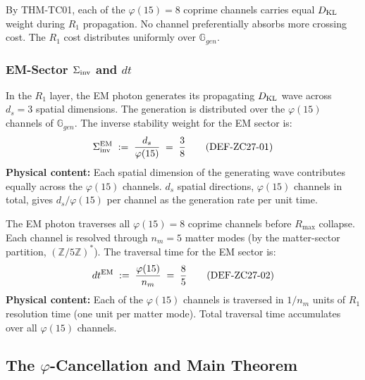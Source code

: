 \documentclass[12pt, a4paper]{article}
\begin{document}
\begin{keybox}[title={Uniformity of $R_1$ Channel Weight}]
By THM-TC01, each of the $\varphi(15) = 8$ coprime channels
carries equal $D_{\rm KL}$ weight during $R_1$ propagation.
No channel preferentially absorbs more crossing cost.
The $R_1$ cost distributes uniformly over $\mathbb{G}_{gen}$.
\end{keybox}

\subsubsection{EM-Sector $\Sigma_{\rm inv}$ and $dt$}

\begin{formalbox}[title={DEF-ZC27-01: $\Sigma_{\rm inv}^{\rm EM}$
  --- Spatial Generation Rate}]
In the $R_1$ layer, the EM photon generates its propagating
$D_{\rm KL}$ wave across $d_s = 3$ spatial dimensions.
The generation is distributed over the $\varphi(15)$ channels
of $\mathbb{G}_{gen}$. The inverse stability weight
for the EM sector is:
\[
  \Sigma_{\rm inv}^{\rm EM}
  \;:=\;
  \frac{d_s}{\varphi(15)}
  \;=\;
  \frac{3}{8}
  \tag{DEF-ZC27-01}\label{zc27:def:sigmainv}
\]
\textbf{Physical content:} Each spatial dimension of the
generating wave contributes equally across the $\varphi(15)$
channels. $d_s$ spatial directions, $\varphi(15)$ channels
in total, gives $d_s/\varphi(15)$ per channel as the
generation rate per unit time.
\end{formalbox}

\begin{formalbox}[title={DEF-ZC27-02: $dt^{\rm EM}$
  --- Channel Traversal Time}]
The EM photon traverses all $\varphi(15) = 8$ coprime
channels before $R_{\max}$ collapse. Each channel is
resolved through $n_m = 5$ matter modes (by the matter-sector
partition, $(\mathbb{Z}/5\mathbb{Z})^*$). The traversal time
for the EM sector is:
\[
  dt^{\rm EM}
  \;:=\;
  \frac{\varphi(15)}{n_m}
  \;=\;
  \frac{8}{5}
  \tag{DEF-ZC27-02}\label{zc27:def:dt}
\]
\textbf{Physical content:} Each of the $\varphi(15)$ channels
is traversed in $1/n_m$ units of $R_1$ resolution time
(one unit per matter mode). Total traversal time accumulates
over all $\varphi(15)$ channels.
\end{formalbox}

\subsection{The $\varphi$-Cancellation and Main Theorem}
\label{zc27:sec:theorem}
\end{document}
